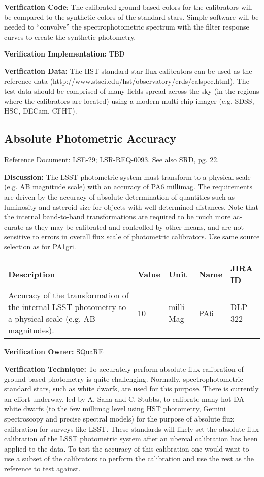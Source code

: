 \textbf{Verification Code}: The calibrated ground-based colors for the
calibrators will be compared to the synthetic colors of the standard
stars. Simple software will be needed to ``convolve'' the
spectrophotometric spectrum with the filter response curves to create
the synthetic photometry.

\textbf{Verification Implementation:} TBD

\textbf{Verification Data:} The HST standard star flux calibrators can
be used as the reference data
(http://www.stsci.edu/hst/observatory/crds/calspec.html). The test data
should be comprised of many fields spread across the sky (in the regions
where the calibrators are located) using a modern multi-chip imager
(e.g. SDSS, HSC, DECam, CFHT).

\subsection{Absolute Photometric
Accuracy}\label{absolute-photometric-accuracy}

Reference Document: LSE-29; LSR-REQ-0093. See also SRD, pg. 22.

\textbf{Discussion:} The LSST photometric system must transform to a
physical scale (e.g. AB magnitude scale) with an accuracy of PA6
millimag. The requirements are driven by the accuracy of absolute
determination of quantities such as luminosity and asteroid size for
objects with well determined distances. Note that the internal
band-to-band transformations are required to be much more ac- curate as
they may be calibrated and controlled by other means, and are not
sensitive to errors in overall flux scale of photometric calibrators.
Use same source selection as for PA1gri.

\begin{longtable}[]{@{}lllll@{}}
\toprule
Description & Value & Unit & Name & JIRA ID\tabularnewline
\midrule
\endhead
Accuracy of the transformation of the internal LSST photometry to a
physical scale (e.g. AB magnitudes). & 10 & milli-Mag & PA6 &
DLP-322\tabularnewline
\bottomrule
\end{longtable}

\textbf{Verification Owner:} SQuaRE

\textbf{Verification Technique:} To accurately perform absolute flux
calibration of ground-based photometry is quite challenging. Normally,
spectrophotometric standard stars, such as white dwarfs, are used for
this purpose. There is currently an effort underway, led by A. Saha and
C. Stubbs, to calibrate many hot DA white dwarfs (to the few millimag
level using HST photometry, Gemini spectroscopy and precise spectral
models) for the purpose of absolute flux calibration for surveys like
LSST. These standards will likely set the absolute flux calibration of
the LSST photometric system after an ubercal calibration has been
applied to the data. To test the accuracy of this calibration one would
want to use a subset of the calibrators to perform the calibration and
use the rest as the reference to test against.

